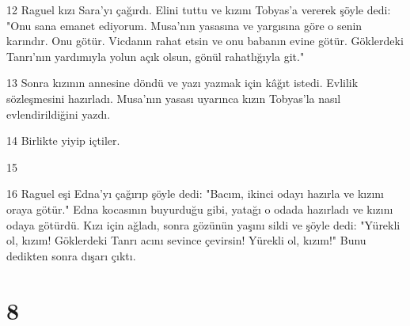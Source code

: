 \par 12 Raguel kızı Sara'yı çağırdı. Eli­ni tuttu ve kızını Tobyas'a vererek şöy­le dedi: "Onu sana emanet ediyorum. Musa'nın yasasına ve yargısına göre o senin karındır. Onu götür. Vicdanın rahat etsin ve onu babanın evine gö­tür. Göklerdeki Tanrı'nın yardımıyla yolun açık olsun, gönül rahatlığıyla git."
\par 13 Sonra kızının annesine döndü ve yazı yazmak için kâğıt istedi. Evli­lik sözleşmesini hazırladı. Musa'nın yasası uyarınca kızın Tobyas'la nasıl evlendirildiğini yazdı.
\par 14 Birlikte yiyip içtiler.
\par 15 
\par 16 Raguel eşi Edna'yı çağırıp şöyle dedi: "Ba­cım, ikinci odayı hazırla ve kızını ora­ya götür." Edna kocasının buyurduğu gibi, yatağı o odada hazırladı ve kızı­nı odaya götürdü. Kızı için ağladı, sonra gözünün yaşını sildi ve şöyle dedi: "Yürekli ol, kızım! Göklerdeki Tanrı acını sevince çevirsin! Yürekli ol, kızım!" Bunu dedikten sonra dışa­rı çıktı.

\chapter{8}

